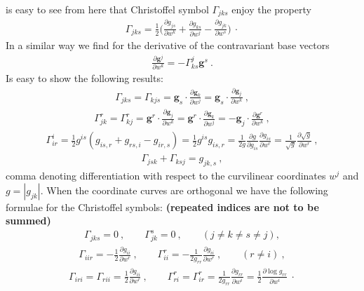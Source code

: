 \documentclass[12pt]{article}
\begin{document}
is easy to see from here that Christoffel symbol $\Gamma_{jks}$ enjoy the property
\begin{align}
\Gamma_{jks}=\frac{1}{2}\bigg(\frac{\partial g_{js}}{\partial w^k}+
\frac{\partial g_{ks}}{\partial w^j}-
\frac{\partial g_{jk}}{\partial w^s}\bigg)\:\cdot
\end{align}
In a similar way we find for the derivative of the contravariant base vectors
\begin{align}
\frac{\partial\mathbf{g}^j}{\partial w^k}=-\Gamma^j_{ks}\mathbf{g}^s\:.
\end{align}
Is easy to show the following results:
\begin{align*}
\Gamma_{jks}=\Gamma_{kjs}=
\mathbf{g}_s\cdot\frac{\partial\mathbf{g}_k}{\partial w^j}=
\mathbf{g}_s\cdot\frac{\partial\mathbf{g}_j}{\partial w^k}\:,
\end{align*}
\begin{align*}
\Gamma^r_{jk}=\Gamma^r_{kj}=\mathbf{g}^r\cdot
\frac{\partial\mathbf{g}_j}{\partial w^k}=
\mathbf{g}^r\cdot
\frac{\partial\mathbf{g}_k}{\partial w^j}=
-\mathbf{g}_j\cdot\frac{\partial\mathbf{g}^r}{\partial w^k}\:,
\end{align*}
\begin{align*}
\Gamma^i_{ir}=\frac{1}{2}g^{is}(g_{is,r}+g_{rs,i}-g_{ir,s})=
\frac{1}{2}g^{is}g_{is,r}=
\frac{1}{2g}\frac{\partial g}{\partial g_{is}}
\frac{\partial g_{is}}{\partial w^r}=
\frac{1}{\sqrt{g}}\frac{\partial\sqrt{g}}{\partial w^r}\:,
\end{align*}
\begin{align*}
\Gamma_{jsk}+\Gamma_{ksj}=g_{jk,s}\:,
\end{align*}
comma denoting differentiation with respect to the curvilinear coordinates $w^j$ and $g=|g_{jk}|$. When the coordinate curves are orthogonal we have the following formulae for the Christoffel symbols: \bf{(repeated indices are not to be summed)}
\begin{align*}
\Gamma_{jks}=0\:, \qquad \Gamma^s_{jk}=0\:, \qquad (j\neq k\neq s\neq j),
\end{align*}
\begin{align*}
\Gamma_{iir}=-\frac{1}{2}\frac{\partial g_{ii}}{\partial w^r}\:, \qquad
\Gamma^r_{ii}=-\frac{1}{2g_{rr}}\frac{\partial g_{ii}}{\partial w^r}\:, \qquad
(r\neq i)\:,
\end{align*}
\begin{align*}
\Gamma_{iri}=\Gamma_{rii}=\frac{1}{2}\frac{\partial g_{ii}}{\partial w^r}\:,
\qquad \Gamma^r_{ri}=\Gamma^r_{ir}=
\frac{1}{2g_{rr}}\frac{\partial g_{rr}}{\partial w^i}=
\frac{1}{2}\frac{\partial\log{g_{rr}}}{\partial w^i}\:\cdot
\end{align*}
\end{document}
